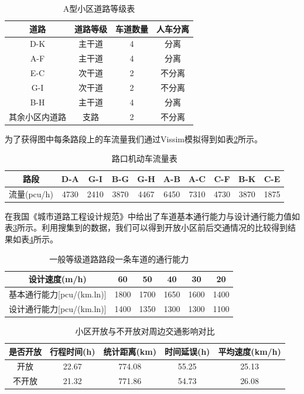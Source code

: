 \documentclass[fontset=fandol,a4paper,12pt]{ctexart}
\begin{document}
		\begin{table}[!htbp]
			\centering
			\caption{A型小区道路等级表}
			\label{tab:road_level_a}
			\begin{tabular}{c|ccc}
				\toprule[1pt] 
				道路&				道路等级&	车道数量&人车分离\\
				\hline
				D-K&				主干道&	4&		分离\\
				A-F&				主干道&	4&		分离\\
				E-C&				次干道&	2&		不分离\\
				G-I&				次干道&	2&		不分离\\
				B-H&				主干道&	4&		分离\\
				其余小区内道路	&		支路&		2&		不分离\\
				\bottomrule[1pt]
			\end{tabular} 
		\end{table}
		为了获得图中每条路段上的车流量我们通过Vissim模拟得到如表\ref{tab:car_flow_a}所示。
		\begin{table}[!htbp]
			\centering
			\caption{路口机动车流量表}
			\label{tab:car_flow_a}
			\begin{tabular}{c|ccccccccc}
				\toprule[1pt] 
				路段&	D-A&	G-I&	B-G&	G-H&	A-B&	A-C&	C-F&	B-K&	C-E\\
				\hline
				流量(pcu/h)&	4730&	2410&	3870&	4467&	6450&	7310&	4730&	3870&	1875\\
				\bottomrule[1pt]
			\end{tabular} 
		\end{table}
		在我国《城市道路工程设计规范》中给出了车道基本通行能力与设计通行能力值如表\ref{tab:road_flow}所示。利用搜集到的数据，我们可以得到开放小区前后交通情况的比较得到结果如表\ref{tab:cmp_each}所示。
		\begin{table}[!htbp]
			\centering
			\caption{一般等级道路路段一条车道的通行能力}
			\label{tab:road_flow}
			\begin{tabular}{c|ccccc}
				\toprule[1pt] 
				设计速度(m/h)&	60&	50&	40&	30&	20\\
				\hline
				基本通行能力[pcu/(km.ln)]& 1800& 1700& 1650& 1600& 1400\\
				设计通行能力[pcu/(km.ln)]& 1400& 1350& 1300& 1300& 1100\\
				\bottomrule[1pt]
			\end{tabular} 
		\end{table}	
		\begin{table}[!htbp]
			\centering
			\caption{小区开放与不开放对周边交通影响对比}
			\label{tab:cmp_each}
			\begin{tabular}{c|cccc}
				\toprule[1pt] 
				是否开放&	行程时间(h)&	统计距离(km)&	时间延误(h)&	平均速度(km/h)\\
				\hline
				开放& 22.67& 774.08& 55.25& 25.13\\
				不开放& 21.32& 771.86& 54.73& 26.08\\
				\bottomrule[1pt]
			\end{tabular} 
		\end{table}		
		
\end{document}
